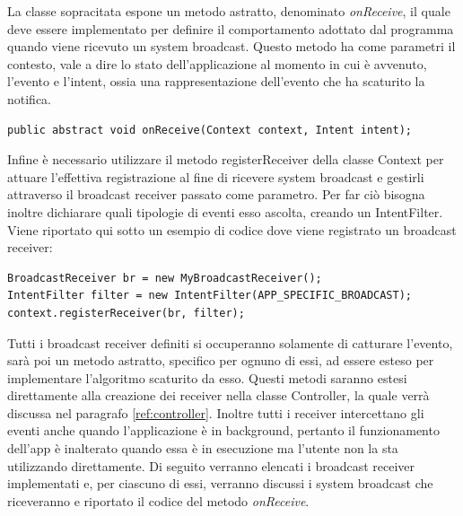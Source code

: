 La classe sopracitata espone un metodo astratto, denominato \textit{onReceive}, il quale deve essere implementato per definire il comportamento adottato dal programma quando viene ricevuto un system broadcast. Questo metodo ha come parametri il contesto, vale a dire lo stato dell'applicazione al momento in cui è avvenuto, l'evento e l'intent, ossia una rappresentazione dell'evento che ha scaturito la notifica.

\begin{verbatim}
public abstract void onReceive(Context context, Intent intent);
\end{verbatim}

Infine è necessario utilizzare il metodo registerReceiver della classe Context per attuare l'effettiva registrazione al fine di ricevere system broadcast e gestirli attraverso il broadcast receiver passato come parametro. Per far ciò bisogna inoltre dichiarare quali tipologie di eventi esso ascolta, creando un IntentFilter. Viene riportato qui sotto un esempio di codice dove viene registrato un broadcast receiver:
\begin{verbatim}
BroadcastReceiver br = new MyBroadcastReceiver();
IntentFilter filter = new IntentFilter(APP_SPECIFIC_BROADCAST);
context.registerReceiver(br, filter);
\end{verbatim}

Tutti i broadcast receiver definiti si occuperanno solamente di catturare l'evento, sarà poi un metodo astratto, specifico per ognuno di essi, ad essere esteso per implementare l'algoritmo scaturito da esso. Questi metodi saranno estesi direttamente alla creazione dei receiver nella classe Controller, la quale verrà discussa nel paragrafo \ref{ref:controller}. Inoltre tutti i receiver intercettano gli eventi anche quando l'applicazione è in background, pertanto il funzionamento dell'app è inalterato quando essa è in esecuzione ma l'utente non la sta utilizzando direttamente. Di seguito verranno elencati i broadcast receiver implementati e, per ciascuno di essi, verranno discussi i system broadcast che riceveranno e riportato il codice del metodo \textit{onReceive}.

